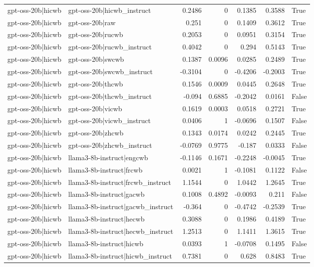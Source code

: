 \begin{table}
\begin{tabular}{l l r r r r l}
gpt-oss-20b|hicwb & gpt-oss-20b|hicwb_instruct & 0.2486 & 0 & 0.1385 & 0.3588 & True \\
gpt-oss-20b|hicwb & gpt-oss-20b|raw & 0.251 & 0 & 0.1409 & 0.3612 & True \\
gpt-oss-20b|hicwb & gpt-oss-20b|rucwb & 0.2053 & 0 & 0.0951 & 0.3154 & True \\
gpt-oss-20b|hicwb & gpt-oss-20b|rucwb_instruct & 0.4042 & 0 & 0.294 & 0.5143 & True \\
gpt-oss-20b|hicwb & gpt-oss-20b|swcwb & 0.1387 & 0.0096 & 0.0285 & 0.2489 & True \\
gpt-oss-20b|hicwb & gpt-oss-20b|swcwb_instruct & -0.3104 & 0 & -0.4206 & -0.2003 & True \\
gpt-oss-20b|hicwb & gpt-oss-20b|thcwb & 0.1546 & 0.0009 & 0.0445 & 0.2648 & True \\
gpt-oss-20b|hicwb & gpt-oss-20b|thcwb_instruct & -0.094 & 0.6885 & -0.2042 & 0.0161 & False \\
gpt-oss-20b|hicwb & gpt-oss-20b|vicwb & 0.1619 & 0.0003 & 0.0518 & 0.2721 & True \\
gpt-oss-20b|hicwb & gpt-oss-20b|vicwb_instruct & 0.0406 & 1 & -0.0696 & 0.1507 & False \\
gpt-oss-20b|hicwb & gpt-oss-20b|zhcwb & 0.1343 & 0.0174 & 0.0242 & 0.2445 & True \\
gpt-oss-20b|hicwb & gpt-oss-20b|zhcwb_instruct & -0.0769 & 0.9775 & -0.187 & 0.0333 & False \\
gpt-oss-20b|hicwb & llama3-8b-instruct|engcwb & -0.1146 & 0.1671 & -0.2248 & -0.0045 & True \\
gpt-oss-20b|hicwb & llama3-8b-instruct|frcwb & 0.0021 & 1 & -0.1081 & 0.1122 & False \\
gpt-oss-20b|hicwb & llama3-8b-instruct|frcwb_instruct & 1.1544 & 0 & 1.0442 & 1.2645 & True \\
gpt-oss-20b|hicwb & llama3-8b-instruct|gacwb & 0.1008 & 0.4892 & -0.0093 & 0.211 & False \\
gpt-oss-20b|hicwb & llama3-8b-instruct|gacwb_instruct & -0.364 & 0 & -0.4742 & -0.2539 & True \\
gpt-oss-20b|hicwb & llama3-8b-instruct|hecwb & 0.3088 & 0 & 0.1986 & 0.4189 & True \\
gpt-oss-20b|hicwb & llama3-8b-instruct|hecwb_instruct & 1.2513 & 0 & 1.1411 & 1.3615 & True \\
gpt-oss-20b|hicwb & llama3-8b-instruct|hicwb & 0.0393 & 1 & -0.0708 & 0.1495 & False \\
gpt-oss-20b|hicwb & llama3-8b-instruct|hicwb_instruct & 0.7381 & 0 & 0.628 & 0.8483 & True \\

\end{tabular}
\end{table}
